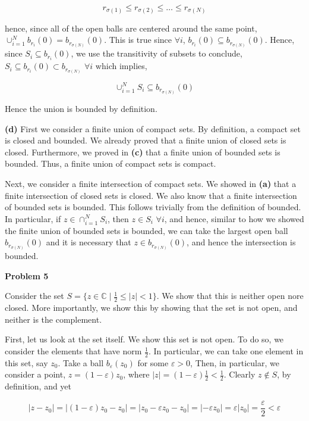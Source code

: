 \documentclass[10pt]{article}
\newcommand{\C}{\mathbb{C}}
\begin{document}
$$r_{\sigma(1)} \leq r_{\sigma(2)} \leq \dots \leq r_{\sigma(N)}$$

hence, since all of the open balls are centered around the same point, $\cup_{i=1}^{N}b_{r_{i}}(0) = b_{r_{\sigma(N)}}(0)$. This is true since $\forall i$, $b_{r_{i}}(0) \subseteq b_{r_{\sigma(N)}}(0)$. Hence, since $S_{i} \subseteq b_{r_{i}}(0)$, we use the transitivity of subsets to conclude, $S_{i} \subseteq b_{r_{i}}(0) \subset b_{r_{\sigma(N)}}$ $\forall i$ which implies,

$$\cup_{i=1}^{N} S_{i} \subseteq b_{r_{\sigma(N)}}(0)$$

Hence the union is bounded by definition.

\textbf{(d)}
First we consider a finite union of compact sets. By definition, a compact set is closed and bounded. We already proved that a finite union of closed sets is closed. Furthermore, we proved in \textbf{(c)} that a finite union of bounded sets is bounded. Thus, a finite union of compact sets is compact.

Next, we consider a finite intersection of compact sets. We showed in \textbf{(a)} that a finite intersection of closed sets is closed. We also know that a finite intersection of bounded sets is bounded. This follows trivially from the definition of bounded. In particular, if $z\in \cap_{i=1}^{N}S_{i}$, then $z \in S_{i}$ $\forall i$, and hence, similar to how we showed the finite union of bounded sets is bounded, we can take the largest open ball $b_{r_{\sigma(N)}}(0)$ and it is necessary that $z \in b_{r_{\sigma(N)}}(0)$, and hence the intersection is bounded.

\newpage

\textbf{Problem 5}

Consider the set $S = \{z\in \C \mid \frac{1}{2} \leq |z| < 1\}$. We show that this is neither open nore closed. More importantly, we show this by showing that the set is not open, and neither is the complement.

First, let us look at the set itself. We show this set is not open. To do so, we consider the elements that have norm $\frac{1}{2}$. In particular, we can take one element in this set, say $z_{0}$. Take a ball $b_{\varepsilon}(z_{0})$ for some $\varepsilon > 0$, Then, in particular, we consider a point, $z = (1-\varepsilon)z_{0}$, where $|z| = (1-\varepsilon)\frac{1}{2} < \frac{1}{2}$. Clearly $z\notin S$, by definition, and yet

$$|z - z_{0}| = |(1-\varepsilon)z_{0} - z_{0}| = |z_{0} - \varepsilon z_{0} - z_{0}| = |-\varepsilon z_{0}| = \varepsilon|z_{0}| = \frac{\varepsilon}{2} < \varepsilon$$
\end{document}
